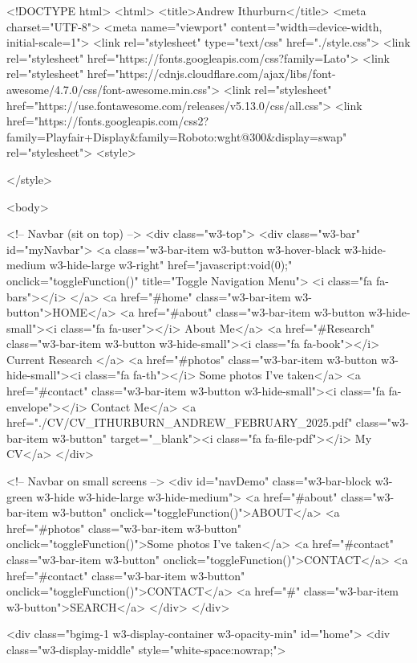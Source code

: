 <!DOCTYPE html>
<html>
<title>Andrew Ithurburn</title>
<meta charset="UTF-8">
<meta name="viewport" content="width=device-width, initial-scale=1">
<link rel="stylesheet" type="text/css" href="./style.css">
<link rel="stylesheet" href="https://fonts.googleapis.com/css?family=Lato">
<link rel="stylesheet" href="https://cdnjs.cloudflare.com/ajax/libs/font-awesome/4.7.0/css/font-awesome.min.css">
<link rel="stylesheet" href="https://use.fontawesome.com/releases/v5.13.0/css/all.css">
<link href="https://fonts.googleapis.com/css2?family=Playfair+Display&family=Roboto:wght@300&display=swap" rel="stylesheet">
<style>

</style>

<body>

    <!-- Navbar (sit on top) -->
    <div class="w3-top">
        <div class="w3-bar" id="myNavbar">
            <a class="w3-bar-item w3-button w3-hover-black w3-hide-medium w3-hide-large w3-right" href="javascript:void(0);" onclick="toggleFunction()" title="Toggle Navigation Menu">
                <i class="fa fa-bars"></i>
            </a>
            <a href="#home" class="w3-bar-item w3-button">HOME</a>
            <a href="#about" class="w3-bar-item w3-button w3-hide-small"><i class="fa fa-user"></i> About Me</a>
            <a href="#Research" class="w3-bar-item w3-button w3-hide-small"><i class="fa fa-book"></i> Current Research </a>
            <a href="#photos" class="w3-bar-item w3-button w3-hide-small"><i class="fa fa-th"></i> Some photos I've taken</a>
            <a href="#contact" class="w3-bar-item w3-button w3-hide-small"><i class="fa fa-envelope"></i> Contact Me</a>
            <a href="./CV/CV_ITHURBURN_ANDREW_FEBRUARY_2025.pdf" class="w3-bar-item w3-button" target="_blank"><i class="fa fa-file-pdf"></i> My CV</a>
        </div>
        

        <!-- Navbar on small screens -->
        <div id="navDemo" class="w3-bar-block w3-green w3-hide w3-hide-large w3-hide-medium">
            <a href="#about" class="w3-bar-item w3-button" onclick="toggleFunction()">ABOUT</a>
            <a href="#photos" class="w3-bar-item w3-button" onclick="toggleFunction()">Some photos I've taken</a>
            <a href="#contact" class="w3-bar-item w3-button" onclick="toggleFunction()">CONTACT</a>
            <a href="#contact" class="w3-bar-item w3-button" onclick="toggleFunction()">CONTACT</a>
            <a href="#" class="w3-bar-item w3-button">SEARCH</a>
        </div>
    </div>

    <div class="bgimg-1 w3-display-container w3-opacity-min" id="home">
        <div class="w3-display-middle" style="white-space:nowrap;">
            

